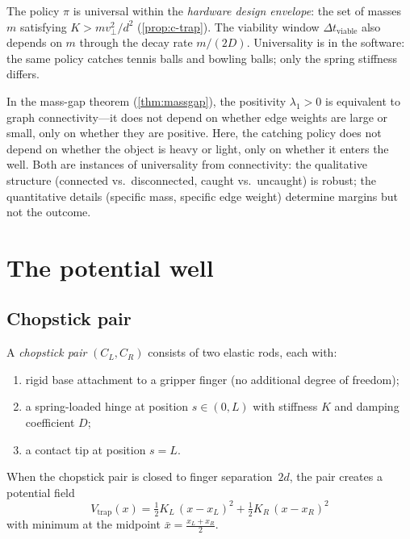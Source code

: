 \begin{remark}
\label{rem:c-envelope}
The policy $\pi$ is universal within the \emph{hardware design
envelope}: the set of masses $m$ satisfying $K > mv_\perp^2/d^2$
(\cref{prop:c-trap}).  The viability window
$\Delta t_{\mathrm{viable}}$ also depends on $m$ through the
decay rate $m/(2D)$.  Universality is in the software: the same
policy catches tennis balls and bowling balls; only the spring
stiffness differs.
\end{remark}

\begin{remark}
In the mass-gap theorem (\cref{thm:massgap}), the positivity
$\lambda_1 > 0$ is equivalent to graph connectivity---it does
not depend on whether edge weights are large or small, only on
whether they are positive.  Here, the catching policy does not
depend on whether the object is heavy or light, only on whether
it enters the well.  Both are instances of universality from
connectivity: the qualitative structure (connected vs.\
disconnected, caught vs.\ uncaught) is robust; the quantitative
details (specific mass, specific edge weight) determine margins
but not the outcome.
\end{remark}


\section{The potential well}
\label{sec:c-well}

\subsection{Chopstick pair}

\begin{definition}
\label{def:c-chopstick}
A \emph{chopstick pair} $(C_L, C_R)$ consists of two elastic
rods, each with:
\begin{enumerate}[label=(\roman*),nosep]
  \item rigid base attachment to a gripper finger (no additional
  degree of freedom);
  \item a spring-loaded hinge at position $s \in (0, L)$ with
  stiffness $K$ and damping coefficient $D$;
  \item a contact tip at position $s = L$.
\end{enumerate}
When the chopstick pair is closed to finger separation~$2d$,
the pair creates a potential field
\[
  V_{\mathrm{trap}}(x)
  = \tfrac{1}{2}K_L\,(x - x_L)^2
  + \tfrac{1}{2}K_R\,(x - x_R)^2
\]
with minimum at the midpoint
$\bar{x} = \frac{x_L + x_R}{2}$.
\end{definition}

